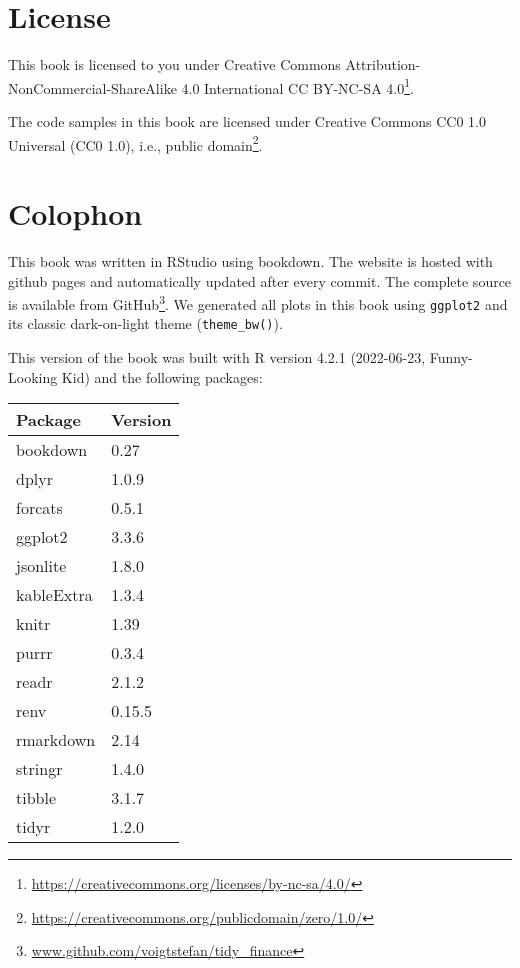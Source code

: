 \documentclass[
]{book}
\renewcommand{\href}[2]{#2\footnote{\url{#1}}}
\begin{document}
\hypertarget{license}{%
\section*{License}\label{license}}


This book is licensed to you under \href{https://creativecommons.org/licenses/by-nc-sa/4.0/}{Creative Commons Attribution-NonCommercial-ShareAlike 4.0 International CC BY-NC-SA 4.0}.

The code samples in this book are licensed under \href{https://creativecommons.org/publicdomain/zero/1.0/}{Creative Commons CC0 1.0 Universal (CC0 1.0), i.e., public domain}.

\hypertarget{colophon}{%
\section*{Colophon}\label{colophon}}


This book was written in RStudio using bookdown. The website is hosted with github pages and automatically updated after every commit. The complete source is \href{www.github.com/voigtstefan/tidy_finance}{available from GitHub}.
We generated all plots in this book using \texttt{ggplot2} and its classic dark-on-light theme (\texttt{theme\_bw()}).

This version of the book was built with R version 4.2.1 (2022-06-23, Funny-Looking Kid) and the following packages:

\begin{tabular}[t]{l|l}
\hline
Package & Version\\
\hline
bookdown & 0.27\\
\hline
dplyr & 1.0.9\\
\hline
forcats & 0.5.1\\
\hline
ggplot2 & 3.3.6\\
\hline
jsonlite & 1.8.0\\
\hline
kableExtra & 1.3.4\\
\hline
knitr & 1.39\\
\hline
purrr & 0.3.4\\
\hline
readr & 2.1.2\\
\hline
renv & 0.15.5\\
\hline
rmarkdown & 2.14\\
\hline
stringr & 1.4.0\\
\hline
tibble & 3.1.7\\
\hline
tidyr & 1.2.0\\
\hline
\end{tabular}

  

\printindex
\end{document}
